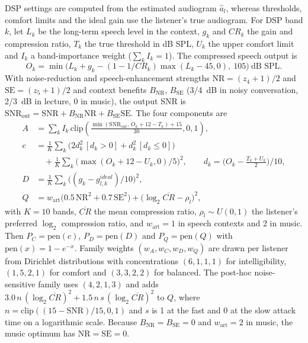 \documentclass[preprint,12pt]{elsarticle}
\begin{document}
DSP settings are computed from the estimated audiogram $\hat a_l$, whereas thresholds, comfort limits and the ideal gain use the listener's true audiogram. For DSP band $k$, let $L_k$ be the long-term speech level in the context, $g_k$ and $CR_k$ the gain and compression ratio, $T_k$ the true threshold in dB SPL, $U_k$ the upper comfort limit and $I_k$ a band-importance weight ($\sum_k I_k=1$). The compressed speech output is
\begin{equation}
 O_k=\min\!\big(L_k+g_k-(1-1/CR_k)\max(L_k-45,0),\ 105\big)\ \text{dB SPL}.
\end{equation}
With noise-reduction and speech-enhancement strengths $\mathrm{NR}=(z_4+1)/2$ and $\mathrm{SE}=(z_5+1)/2$ and context benefits $B_{\mathrm{NR}}$, $B_{\mathrm{SE}}$ (3/4~dB in noisy conversation, 2/3~dB in lecture, 0 in music), the output SNR is $\mathrm{SNR}_{\mathrm{out}}=\mathrm{SNR}+B_{\mathrm{NR}}\mathrm{NR}+B_{\mathrm{SE}}\mathrm{SE}$. The four components are
\begin{align}
 A &= \textstyle\sum_k I_k\,\mathrm{clip}\!\left(\frac{\min(\mathrm{SNR}_{\mathrm{out}},\,O_k+12-T_k)+15}{30},0,1\right),\\
 c &= \tfrac{1}{K}\textstyle\sum_k \big(2d_k^2\,[d_k>0]+d_k^2\,[d_k\le0]\big)\nonumber\\
   &\quad+\tfrac{1}{K}\textstyle\sum_k \big(\max(O_k+12-U_k,0)/5\big)^2,\qquad d_k=\big(O_k-\tfrac{T_k+U_k}{2}\big)/10,\\
 D &= \tfrac{1}{K}\textstyle\sum_k\big((g_k-g^{ideal}_{l,k})/10\big)^2,\\
 Q &= w_{\mathrm{art}}\big(0.5\,\mathrm{NR}^2+0.7\,\mathrm{SE}^2\big)+\big(\log_2\overline{CR}-\rho_l\big)^2,
\end{align}
with $K=10$ bands, $\overline{CR}$ the mean compression ratio, $\rho_l\sim U(0,1)$ the listener's preferred $\log_2$ compression ratio, and $w_{\mathrm{art}}=1$ in speech contexts and 2 in music. Then $P_C=\mathrm{pen}(c)$, $P_D=\mathrm{pen}(D)$ and $P_Q=\mathrm{pen}(Q)$ with $\mathrm{pen}(x)=1-e^{-x}$. Family weights $(w_A,w_C,w_D,w_Q)$ are drawn per listener from Dirichlet distributions with concentrations $(6,1,1,1)$ for intelligibility, $(1,5,2,1)$ for comfort and $(3,3,2,2)$ for balanced. The post-hoc noise-sensitive family uses $(4,2,1,3)$ and adds $3.0\,n\,(\log_2\overline{CR})^2+1.5\,n\,s\,(\log_2\overline{CR})^2$ to $Q$, where $n=\mathrm{clip}((15-\mathrm{SNR})/15,0,1)$ and $s$ is 1 at the fast and 0 at the slow attack time on a logarithmic scale. Because $B_{\mathrm{NR}}=B_{\mathrm{SE}}=0$ and $w_{\mathrm{art}}=2$ in music, the music optimum has $\mathrm{NR}=\mathrm{SE}=0$.



\end{document}
